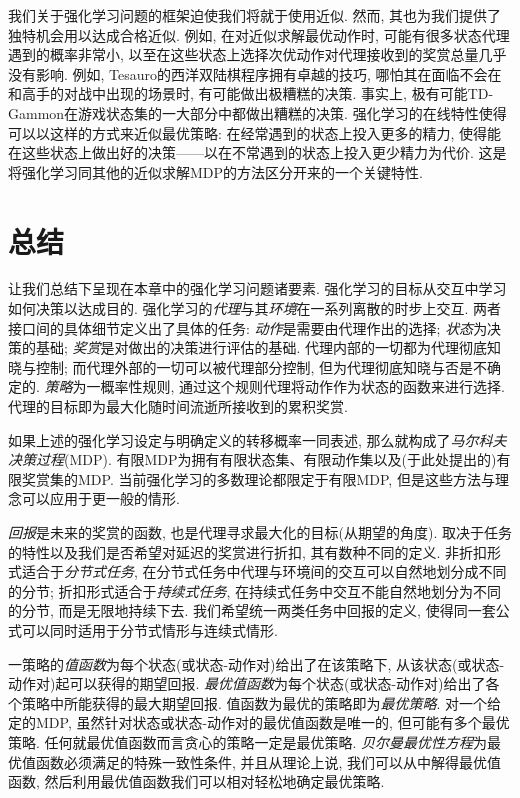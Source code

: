 我们关于强化学习问题的框架迫使我们将就于使用近似. 然而, 其也为我们提供了独特机会用以达成合格近似. 例如, 在对近似求解最优动作时, 可能有很多状态代理遇到的概率非常小, 以至在这些状态上选择次优动作对代理接收到的奖赏总量几乎没有影响. 例如, Tesauro的西洋双陆棋程序拥有卓越的技巧, 哪怕其在面临不会在和高手的对战中出现的场景时, 有可能做出极糟糕的决策. 事实上, 极有可能TD-Gammon在游戏状态集的一大部分中都做出糟糕的决策. 强化学习的在线特性使得可以以这样的方式来近似最优策略: 在经常遇到的状态上投入更多的精力, 使得能在这些状态上做出好的决策——以在不常遇到的状态上投入更少精力为代价. 这是将强化学习同其他的近似求解MDP的方法区分开来的一个关键特性.

\section{总结}\label{sec:3.8}

让我们总结下呈现在本章中的强化学习问题诸要素. 强化学习的目标从交互中学习如何决策以达成目的. 强化学习的\emph{代理}与其\emph{环境}在一系列离散的时步上交互. 两者接口间的具体细节定义出了具体的任务: \emph{动作}是需要由代理作出的选择; \emph{状态}为决策的基础; \emph{奖赏}是对做出的决策进行评估的基础. 代理内部的一切都为代理彻底知晓与控制; 而代理外部的一切可以被代理部分控制, 但为代理彻底知晓与否是不确定的. \emph{策略}为一概率性规则, 通过这个规则代理将动作作为状态的函数来进行选择. 代理的目标即为最大化随时间流逝所接收到的累积奖赏.

如果上述的强化学习设定与明确定义的转移概率一同表述, 那么就构成了\emph{马尔科夫决策过程}(MDP). 有限MDP为拥有有限状态集、有限动作集以及(于此处提出的)有限奖赏集的MDP. 当前强化学习的多数理论都限定于有限MDP, 但是这些方法与理念可以应用于更一般的情形.

\emph{回报}是未来的奖赏的函数, 也是代理寻求最大化的目标(从期望的角度). 取决于任务的特性以及我们是否希望对延迟的奖赏进行折扣, 其有数种不同的定义. 非折扣形式适合于\emph{分节式任务}, 在分节式任务中代理与环境间的交互可以自然地划分成不同的分节; 折扣形式适合于\emph{持续式任务}, 在持续式任务中交互不能自然地划分为不同的分节, 而是无限地持续下去. 我们希望统一两类任务中回报的定义, 使得同一套公式可以同时适用于分节式情形与连续式情形.

一策略的\emph{值函数}为每个状态(或状态-动作对)给出了在该策略下, 从该状态(或状态-动作对)起可以获得的期望回报. \emph{最优值函数}为每个状态(或状态-动作对)给出了各个策略中所能获得的最大期望回报. 值函数为最优的策略即为\emph{最优策略}. 对一个给定的MDP, 虽然针对状态或状态-动作对的最优值函数是唯一的, 但可能有多个最优策略. 任何就最优值函数而言贪心的策略一定是最优策略. \emph{贝尔曼最优性方程}为最优值函数必须满足的特殊一致性条件, 并且从理论上说, 我们可以从中解得最优值函数, 然后利用最优值函数我们可以相对轻松地确定最优策略.

